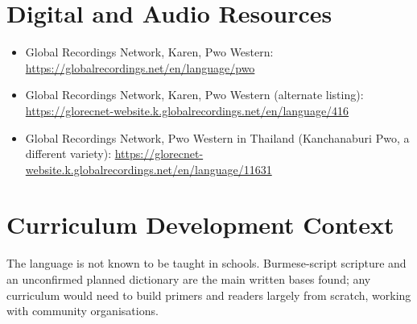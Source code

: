 \documentclass[12pt]{article}
\begin{document}
\section{Digital and Audio Resources}
\begin{itemize}
\item Global Recordings Network, Karen, Pwo Western: \url{https://globalrecordings.net/en/language/pwo}
\item Global Recordings Network, Karen, Pwo Western (alternate listing): \url{https://glorecnet-website.k.globalrecordings.net/en/language/416}
\item Global Recordings Network, Pwo Western in Thailand (Kanchanaburi Pwo, a different variety): \url{https://glorecnet-website.k.globalrecordings.net/en/language/11631}
\end{itemize}

\section{Curriculum Development Context}
The language is not known to be taught in schools. Burmese-script scripture and an unconfirmed planned dictionary are the main written bases found; any curriculum would need to build primers and readers largely from scratch, working with community organisations.
\end{document}
